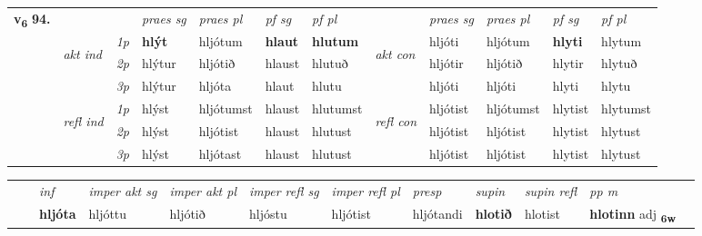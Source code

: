 \begin{tabular}{llllllllllll} \toprule
\multirow{4}{*}{{{\textbf{v{\textsubscript{6}}} \Large{\textbf{94.}}}}}  & &   &  \textit{praes sg}  & \textit{praes pl}  &\textit{ pf sg} & \textit{pf pl} &  &  \textit{praes sg}  & \textit{praes pl}  & \textit{pf sg} & \textit{pf pl } \\*
	\cmidrule{4-7} \cmidrule{9-12}
 & \multirow{3}{*}{\begin{turn}{90}\textit{akt ind}\end{turn}} & {\textit{1p}} & \textbf{hlýt} & hljótum    & \textbf{hlaut} & \textbf{hlutum} & \multirow{3}{*}{\begin{turn}{90}\textit{akt con}\end{turn}} &hljóti & hljótum & \textbf{hlyti} & hlytum\\*
& &  {\textit{2p}} &  hlýtur  & hljótið   & hlaust & hlutuð & & hljótir & hljótið & hlytir & hlytuð \\*
& &  {\textit{3p}} & hlýtur & hljóta   & hlaut & hlutu & & hljóti & hljóti& hlyti & hlytu  \\*
\cmidrule{4-7} \cmidrule{9-12}
 &\multirow{3}{*}{\begin{turn}{90}\textit{refl ind}\end{turn}} & {\textit{1p}} & hlýst & hljótumst    & hlaust & hlutumst & \multirow{3}{*}{\begin{turn}{90}\textit{refl con}\end{turn}}  &hljótist & hljótumst & hlytist & hlytumst\\*
 &&  {\textit{2p}} &  hlýst  & hljótist   & hlaust & hlutust & &hljótist & hljótist & hlytist & hlytust \\*
& &  {\textit{3p}} & hlýst & hljótast   & hlaust & hlutust & & hljótist & hljótist& hlytist & hlytust  \\*
\cmidrule{4-7} \cmidrule{9-12}
\end{tabular}


\begin{tabular}{llllllllllll}
 & & \textit{inf} & \textit{imper akt sg} & \textit{imper akt pl} & \textit{imper refl sg} & \textit{imper refl pl} & \textit{presp} & \textit{supin} & \textit{supin refl} & \textit{pp m}     \\*
  & & \textbf{hljóta} & hljóttu  & hljótið & hljóstu & hljótist & hljótandi &  \textbf{hlotið} & hlotist & \textbf{hlotinn} adj \textbf{\textsubscript{6w}} \\*
\cmidrule{1-12}
\end{tabular}




